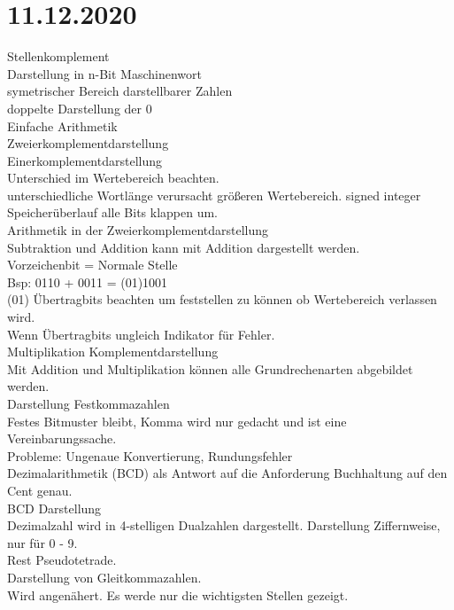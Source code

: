 \documentclass{article}
\begin{document}
	\section*{11.12.2020}
	Stellenkomplement \\
	Darstellung in n-Bit Maschinenwort \\
	symetrischer Bereich darstellbarer Zahlen \\
	doppelte Darstellung der 0 \\
	Einfache Arithmetik \\
	Zweierkomplementdarstellung \\
	Einerkomplementdarstellung \\
	Unterschied im Wertebereich beachten. \\
	unterschiedliche Wortlänge verursacht größeren Wertebereich. signed integer \\
	Speicherüberlauf alle Bits klappen um. \\
	Arithmetik in der Zweierkomplementdarstellung \\
	Subtraktion und Addition kann mit Addition dargestellt werden. \\
	Vorzeichenbit = Normale Stelle \\
	Bsp: 0110 + 0011 = (01)1001 \\
	(01) Übertragbits beachten um feststellen zu können ob Wertebereich verlassen wird. \\
	Wenn Übertragbits ungleich Indikator für Fehler. \\
	Multiplikation Komplementdarstellung \\
	Mit Addition und Multiplikation können alle Grundrechenarten abgebildet werden. \\
	Darstellung Festkommazahlen \\
	Festes Bitmuster bleibt, Komma wird nur gedacht und ist eine Vereinbarungssache. \\
	Probleme: Ungenaue Konvertierung, Rundungsfehler \\
	Dezimalarithmetik (BCD) als Antwort auf die Anforderung Buchhaltung auf den Cent genau. \\
	BCD Darstellung \\
	Dezimalzahl wird in 4-stelligen Dualzahlen dargestellt.
	Darstellung Ziffernweise, nur für 0 - 9. \\
	Rest Pseudotetrade. \\
	Darstellung von Gleitkommazahlen. \\
	Wird angenähert. Es werde nur die wichtigsten Stellen gezeigt. \\
\end{document}
